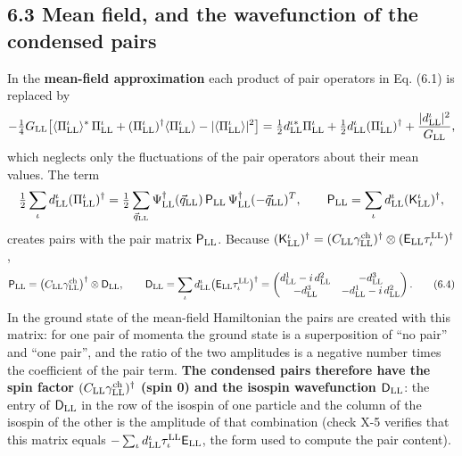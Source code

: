 \documentclass[
  10pt,
]{article}
\begin{document}
\hypertarget{mean-field-and-the-wavefunction-of-the-condensed-pairs}{%
\subsection{6.3 Mean field, and the wavefunction of the condensed
pairs}\label{mean-field-and-the-wavefunction-of-the-condensed-pairs}}

In the \textbf{mean-field approximation} each product of pair operators
in Eq. (6.1) is replaced by
\[-\tfrac14G_{\rm LL}\big[\langle\Pi^\iota_{\rm LL}\rangle^*\,\Pi^\iota_{\rm LL}+(\Pi^\iota_{\rm LL})^\dagger\langle\Pi^\iota_{\rm LL}\rangle-\lvert\langle\Pi^\iota_{\rm LL}\rangle\rvert^2\big]=\tfrac12d^{\iota*}_{\rm LL}\Pi^\iota_{\rm LL}+\tfrac12d^\iota_{\rm LL}(\Pi^\iota_{\rm LL})^\dagger+\frac{\lvert d^\iota_{\rm LL}\rvert^2}{G_{\rm LL}} ,\]
which neglects only the fluctuations of the pair operators about their
mean values. The term
\[\tfrac12\sum_\iota d^\iota_{\rm LL}(\Pi^\iota_{\rm LL})^\dagger=\tfrac12\sum_{\vec q_{\rm LL}}\Psi^\dagger_{\rm LL}(\vec q_{\rm LL})\,\mathsf P_{\rm LL}\,\Psi^\dagger_{\rm LL}(-\vec q_{\rm LL})^T,\qquad\mathsf P_{\rm LL}=\sum_\iota d^\iota_{\rm LL}(\mathsf K^\iota_{\rm LL})^\dagger ,\]
creates pairs with the pair matrix \(\mathsf P_{\rm LL}\). Because
\((\mathsf K^\iota_{\rm LL})^\dagger=(C_{\rm LL}\gamma^{\rm ch}_{\rm LL})^\dagger\otimes(\mathsf E_{\rm LL}\tau^{\rm LL}_\iota)^\dagger\),
\[\mathsf P_{\rm LL}=\big(C_{\rm LL}\gamma^{\rm ch}_{\rm LL}\big)^\dagger\otimes\mathsf D_{\rm LL},\qquad\mathsf D_{\rm LL}=\sum_\iota d^\iota_{\rm LL}\big(\mathsf E_{\rm LL}\tau^{\rm LL}_\iota\big)^\dagger=\begin{pmatrix}d^1_{\rm LL}-i\,d^2_{\rm LL}&-d^3_{\rm LL}\\-d^3_{\rm LL}&-d^1_{\rm LL}-i\,d^2_{\rm LL}\end{pmatrix}. \tag{6.4}\]
In the ground state of the mean-field Hamiltonian the pairs are created
with this matrix: for one pair of momenta the ground state is a
superposition of ``no pair'' and ``one pair'', and the ratio of the two
amplitudes is a negative number times the coefficient of the pair term.
\textbf{The condensed pairs therefore have the spin factor
\((C_{\rm LL}\gamma^{\rm ch}_{\rm LL})^\dagger\) (spin 0) and the
isospin wavefunction \(\mathsf D_{\rm LL}\)}: the entry of
\(\mathsf D_{\rm LL}\) in the row of the isospin of one particle and the
column of the isospin of the other is the amplitude of that combination
(check X-5 verifies that this matrix equals
\(-\sum_\iota d^\iota_{\rm LL}\tau^{\rm LL}_\iota\mathsf E_{\rm LL}\),
the form used to compute the pair content).
\end{document}
